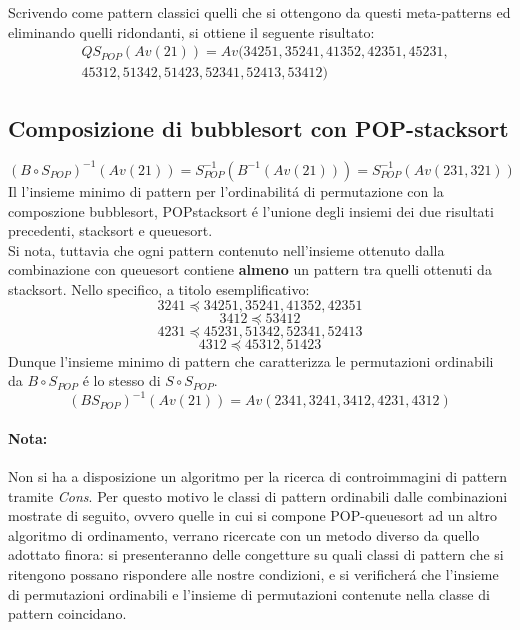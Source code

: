 Scrivendo come pattern classici quelli che si ottengono da questi meta-patterns ed eliminando quelli ridondanti, si ottiene il seguente risultato:
\begin{eqnarray*}
&Q{S_{POP}}(Av(21)) = Av(34251, 35241, 41352, 42351, 45231, \\
& 45312, 51342, 51423, 52341, 52413, 53412)
\end{eqnarray*}
\subsection*{Composizione di {bubblesort} con {POP-stacksort}}
$$(B\circ{S}_{POP})^{-1}(Av(21)) = S_{POP}^{-1}(B^{-1}(Av(21))) = S_{POP}^{-1}(Av(231,321))$$
Il l'insieme minimo di pattern per l'ordinabilit\'a di permutazione con la composzione bubblesort, POPstacksort \'e l'unione degli insiemi dei due risultati precedenti, stacksort e queuesort.\\
Si nota, tuttavia che ogni pattern contenuto nell'insieme ottenuto dalla combinazione con queuesort contiene \textbf{almeno} un pattern tra quelli ottenuti da stacksort. Nello specifico, a titolo esemplificativo:$$3241\preceq34251, 35241, 41352, 42351$$$$3412\preceq53412$$$$4231\preceq45231, 51342, 52341, 52413$$$$4312\preceq45312, 51423$$ 
Dunque l'insieme minimo di pattern che caratterizza le permutazioni ordinabili da $B\circ{S}_{POP}$ \'e lo stesso di $S\circ{S}_{POP}$.
$$(B{S_{POP}})^{-1}(Av(21)) = Av(2341, 3241, 3412, 4231, 4312)$$
\paragraph*{Nota:} Non si ha a disposizione un algoritmo per la ricerca di controimmagini di pattern tramite \textit{Cons}. Per questo motivo le classi di pattern ordinabili dalle combinazioni mostrate di seguito, ovvero quelle in cui si compone POP-queuesort ad un altro algoritmo di ordinamento, verrano ricercate con un metodo diverso da quello adottato finora: si presenteranno delle congetture su quali classi di pattern che si ritengono possano rispondere alle nostre condizioni, e si verificher\'a che l'insieme di permutazioni ordinabili e l'insieme di permutazioni contenute nella classe di pattern coincidano.

